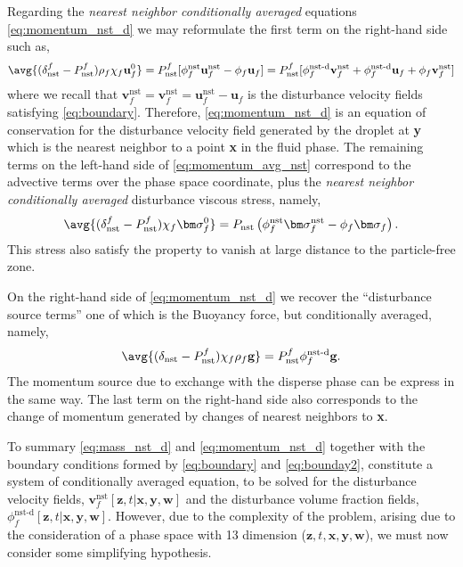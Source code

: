 Regarding the \textit{nearest neighbor conditionally averaged} equations \eqref{eq:momentum_nst_d} we may reformulate the first term on the right-hand side such as, 
\begin{equation}
    \avg{(\delta_\text{nst}^f - P_\text{nst}^f)\rho_f\chi_f\textbf{u}_f^0}
    = P_\text{nst}^f [
        \phi_f^\text{nst}\textbf{u}_f^\text{nst}
        - 
        \phi_f\textbf{u}_f
    ]
    = P_\text{nst}^f [
        \phi_f^\text{nst-d}\textbf{v}_f^\text{nst}
        + \phi_f^\text{nst-d}\textbf{u}_f
        + \phi_f \textbf{v}_f^\text{nst}
    ]
\end{equation}
where we recall that $\textbf{v}_f^\text{nst} = \textbf{v}_f^\text{nst} = \textbf{u}_f^\text{nst} - \textbf{u}_f$ is the disturbance velocity fields satisfying \ref{eq:boundary}. 
Therefore, \ref{eq:momentum_nst_d} is an equation of conservation for the disturbance velocity field generated by the droplet at \textbf{y} which is the nearest neighbor to a point \textbf{x} in the fluid phase. 
The remaining terms on the left-hand side of \ref{eq:momentum_avg_nst} correspond to the advective terms over the phase space coordinate, plus the \textit{nearest neighbor conditionally averaged } disturbance viscous stress, namely, 
\begin{equation}
    \avg{(\delta_\text{nst}^f - P_\text{nst}^f)\chi_f \bm\sigma_f^0}
    = P_\text{nst} \left(
        \phi_f^\text{nst}\bm\sigma^\text{nst}_f
        - \phi_f\bm\sigma_f
    \right). 
\end{equation}
This stress also satisfy the property to vanish at large distance to the particle-free zone.

On the right-hand side of \ref{eq:momentum_nst_d} we recover the ``disturbance source terms'' one of which is the Buoyancy force, but conditionally averaged, namely, 
\begin{equation*}
    \avg{(\delta_\text{nst} - P_\text{nst}^f) \chi_f \rho_f \textbf{g}}
    = 
    P_\text{nst}^f \phi_f^\text{nst-d} \textbf{g}. 
\end{equation*}
The momentum source due to exchange with the disperse phase can be express in the same way. 
The last term on the right-hand side also corresponds to the change of momentum generated by changes of nearest neighbors to \textbf{x}. 


To summary \ref{eq:mass_nst_d} and \ref{eq:momentum_nst_d} together with the boundary conditions formed by \ref{eq:boundary} and \ref{eq:bounday2}, constitute a system of conditionally averaged equation, to be solved for the disturbance velocity fields, $\textbf{v}_f^\text{nst}[\textbf{z},t|\textbf{x},\textbf{y},\textbf{w}]$ and the disturbance volume fraction fields, $\phi_f^\text{nst-d}[\textbf{z},t|\textbf{x},\textbf{y},\textbf{w}]$.
However, due to the complexity of the problem, arising due to the consideration of a phase space with  13 dimension ($\textbf{z},t,\textbf{x},\textbf{y},\textbf{w}$), we must now consider some simplifying hypothesis.

